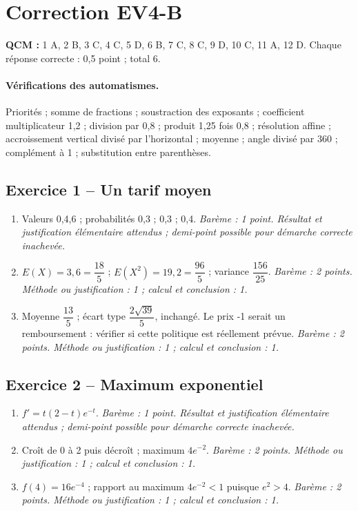 \clearpage\section*{Correction EV4-B}\label{EV4-B-CORR}
\textbf{QCM :} 1 A, 2 B, 3 C, 4 C, 5 D, 6 B, 7 C, 8 C, 9 D, 10 C, 11 A, 12 D. Chaque réponse correcte : 0,5 point ; total 6.
\paragraph{Vérifications des automatismes.} Priorités ; somme de fractions ; soustraction des exposants ; coefficient multiplicateur 1,2 ; division par 0,8 ; produit 1,25 fois 0,8 ; résolution affine ; accroissement vertical divisé par l’horizontal ; moyenne ; angle divisé par 360 ; complément à 1 ; substitution entre parenthèses.
\subsection*{Exercice 1 -- Un tarif moyen}
\begin{enumerate}
\item Valeurs 0,4,6 ; probabilités 0,3 ; 0,3 ; 0,4. \textit{Barème : 1 point. Résultat et justification élémentaire attendus ; demi-point possible pour démarche correcte inachevée.}
\item $E(X)=3{,}6=\dfrac{18}{5}$ ; $E(X^2)=19{,}2=\dfrac{96}{5}$ ; variance $\dfrac{156}{25}$. \textit{Barème : 2 points. Méthode ou justification : 1 ; calcul et conclusion : 1.}
\item Moyenne $\dfrac{13}{5}$ ; écart type $\dfrac{2\sqrt {39}}{5}$, inchangé. Le prix -1 serait un remboursement : vérifier si cette politique est réellement prévue. \textit{Barème : 2 points. Méthode ou justification : 1 ; calcul et conclusion : 1.}
\end{enumerate}
\subsection*{Exercice 2 -- Maximum exponentiel}
\begin{enumerate}
\item $f\prime=t(2-t)e^{-t}$. \textit{Barème : 1 point. Résultat et justification élémentaire attendus ; demi-point possible pour démarche correcte inachevée.}
\item Croît de 0 à 2 puis décroît ; maximum $4e^{-2}$. \textit{Barème : 2 points. Méthode ou justification : 1 ; calcul et conclusion : 1.}
\item $f(4)=16e^{-4}$ ; rapport au maximum $4e^{-2}<1$ puisque $e^2>4$. \textit{Barème : 2 points. Méthode ou justification : 1 ; calcul et conclusion : 1.}
\end{enumerate}
